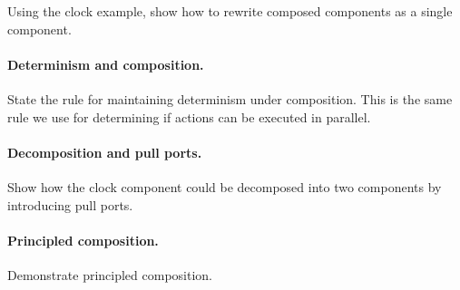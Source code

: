 Using the clock example, show how to rewrite composed components as a single component.

\paragraph{Determinism and composition.}

State the rule for maintaining determinism under composition.
This is the same rule we use for determining if actions can be executed in parallel.

\paragraph{Decomposition and pull ports.}

Show how the clock component could be decomposed into two components by introducing pull ports.

\paragraph{Principled composition.}

Demonstrate principled composition.




